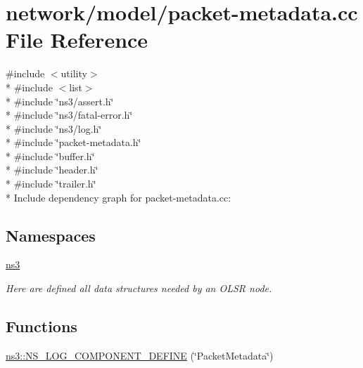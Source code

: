 \hypertarget{packet-metadata_8cc}{}\section{network/model/packet-\/metadata.cc File Reference}
\label{packet-metadata_8cc}
{\ttfamily \#include $<$utility$>$}\\*
{\ttfamily \#include $<$list$>$}\\*
{\ttfamily \#include \char`\"{}ns3/assert.\+h\char`\"{}}\\*
{\ttfamily \#include \char`\"{}ns3/fatal-\/error.\+h\char`\"{}}\\*
{\ttfamily \#include \char`\"{}ns3/log.\+h\char`\"{}}\\*
{\ttfamily \#include \char`\"{}packet-\/metadata.\+h\char`\"{}}\\*
{\ttfamily \#include \char`\"{}buffer.\+h\char`\"{}}\\*
{\ttfamily \#include \char`\"{}header.\+h\char`\"{}}\\*
{\ttfamily \#include \char`\"{}trailer.\+h\char`\"{}}\\*
Include dependency graph for packet-\/metadata.cc\+:
\subsection*{Namespaces}
\begin{DoxyCompactItemize}
\item 
 \hyperlink{namespacens3}{ns3}
\begin{DoxyCompactList}\small\item\em Here are defined all data structures needed by an O\+L\+SR node. \end{DoxyCompactList}\end{DoxyCompactItemize}
\subsection*{Functions}
\begin{DoxyCompactItemize}
\item 
\hyperlink{namespacens3_a2e633a7123ed454685ce8422316da8d1}{ns3\+::\+N\+S\+\_\+\+L\+O\+G\+\_\+\+C\+O\+M\+P\+O\+N\+E\+N\+T\+\_\+\+D\+E\+F\+I\+NE} (\char`\"{}Packet\+Metadata\char`\"{})
\end{DoxyCompactItemize}
